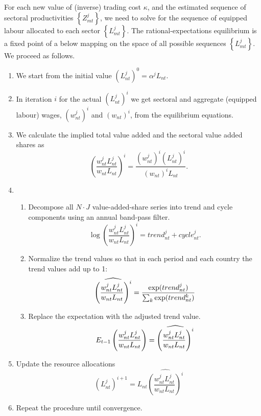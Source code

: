 \documentclass[12pt]{article}
\begin{document}
For each new value of (inverse) trading cost $\kappa $, and the estimated
sequence of sectoral productivities $\left\{ Z_{mt}^{j}\right\} $, we need
to solve for the sequence of equipped labour allocated to each sector $%
\left\{ L_{mt}^{j}\right\} $. The rational-expectations equilibrium is a
fixed point of a below mapping on the space of all possible sequences $%
\left\{ L_{mt}^{j}\right\} $. We proceed as follows.

\begin{enumerate}
\item We start from the initial value $(L_{nt}^j)^0 = \alpha^j L_{nt}$.

\item In iteration $i$ for the actual $(L_{nt}^{j})^{i}$ we get sectoral and
aggregate (equipped labour) wages, $(w_{nt}^{j})^{i}$ and $(w_{nt})^{i}$,
from the equilibrium equations.

\item We calculate the implied total value added and the sectoral value
added shares as 
\begin{equation*}
\left(\frac{w_{nt}^j L_{nt}^j}{w_{nt} L_{nt}}\right)^i = \frac{(w_{nt}^j)^i
(L_{nt}^j)^i}{(w_{nt})^i L_{nt}}.
\end{equation*}

\item 
\begin{enumerate}
\item Decompose all $N\cdot J$ value-added-share series into trend and cycle
components using an annual band-pass filter. 
\begin{equation*}
\log \left( \frac{w_{nt}^{j}L_{nt}^{j}}{w_{nt}L_{nt}}\right)
^{i}=trend_{nt}^{j}+cycle_{nt}^{j}.
\end{equation*}

\item Normalize the trend values so that in each period and each country the
trend values add up to 1: 
\begin{equation*}
\widehat{\left( \frac{w_{nt}^{j}L_{nt}^{j}}{w_{nt}L_{nt}}\right) ^{i}}=\frac{%
\exp (trend_{nt}^{j})}{\sum_{k}\exp (trend_{nt}^{k})}
\end{equation*}

\item Replace the expectation with the adjusted trend value. 
\begin{equation*}
E_{t - 1} \left( \frac{w_{nt}^j L_{nt}^j}{w_{nt} L_{nt}}\right) = \widehat{%
\left(\frac{w_{nt}^j L_{nt}^j}{w_{nt} L_{nt}}\right)^i}
\end{equation*}
\end{enumerate}

\item Update the resource allocations 
\begin{equation*}
(L_{nt}^j)^{i + 1} = L_{nt} \widehat{\left(\frac{w_{nt}^j L_{nt}^j}{w_{nt}
L_{nt}}\right)^i}
\end{equation*}

\item Repeat the procedure until convergence.
\end{enumerate}
\end{document}
